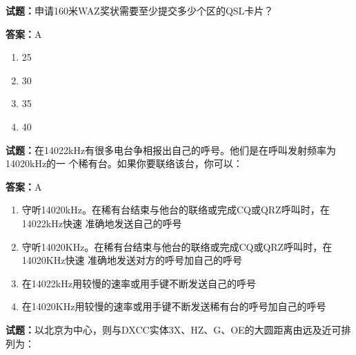 \documentclass{ctexbook}
\begin{document}





\vspace{1em}

\textbf{试题：}申请160米WAZ奖状需要至少提交多少个区的QSL卡片？ 

\textbf{答案：}A 

\begin{enumerate}[leftmargin=3em]
  \item 25 

  \item 30 

  \item 35 

  \item 40 

\end{enumerate}





\vspace{1em}

\textbf{试题：}在14022kHz有很多电台争相报出自己的呼号。他们是在呼叫发射频率为14020kHz的一
个稀有台。如果你要联络该台，你可以： 

\textbf{答案：}A 

\begin{enumerate}[leftmargin=3em]
  \item 守听14020kHz。在稀有台结束与他台的联络或完成CQ或QRZ呼叫时，在14022kHz快速
准确地发送自己的呼号 

  \item 守听14020KHz。在稀有台结束与他台的联络或完成CQ或QRZ呼叫时，在14020KHz快速
准确地发送对方的呼号加自己的呼号 

  \item 在14022kHz用较慢的速率或用手键不断发送自己的呼号 

  \item 在14020KHz用较慢的速率或用手键不断发送稀有台的呼号加自己的呼号 

\end{enumerate}





\vspace{1em}

\textbf{试题：}以北京为中心，则与DXCC实体3X、HZ、G、OE的大圆距离由远及近可排列为： 
\end{document}

